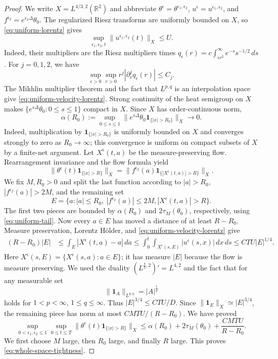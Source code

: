 \documentclass[11pt,reqno]{amsproc}
\newcommand{\R}{\mathbb R}
\newcommand{\one}{\mathbf 1}
\newcommand{\dd}{\,d}
\begin{document}
\begin{proof}
We write $X=L^{4/3,2}(\R^2)$ and abbreviate
$\theta^\epsilon=\theta^{\epsilon_1,\epsilon_2}$,
$u^\epsilon=u^{\epsilon_1,\epsilon_2}$, and
$f^{\epsilon_2}=e^{\epsilon_2\Delta}\theta_0$.  The regularized Riesz
transforms are uniformly bounded on $X$, so \eqref{eq:uniform-lorentz} gives
\begin{equation}\label{eq:uniform-velocity-lorentz}
 \sup_{\epsilon_1,\epsilon_2,t}
 \|u^{\epsilon_1,\epsilon_2}(t)\|_X\le U.
\end{equation}
Indeed, their multipliers are the Riesz multipliers times
$q_\epsilon(r)=c\int_{\epsilon r^2}^\infty e^{-s}s^{-1/2}\dd s$.  For
$j=0,1,2$, we have
\[
  \sup_{\epsilon>0}\sup_{r>0}
  r^j|\partial_r^jq_\epsilon(r)|\leq C_j.
\]
The Mikhlin multiplier theorem and the fact that $L^{p,q}$ is an interpolation space give \eqref{eq:uniform-velocity-lorentz}.
Strong continuity of the heat semigroup on $X$ makes
$\{e^{s\Delta}\theta_0:0\le s\le1\}$ compact in $X$.  Since $X$ has
order-continuous norm,
\begin{equation}\label{eq:initial-spatial-tail}
 \alpha(R_0):=\sup_{0\le s\le1}
 \|e^{s\Delta}\theta_0\one_{\{|x|>R_0\}}\|_X\longrightarrow0.
\end{equation}
Indeed, multiplication by $\one_{\{|x|>R_0\}}$ is uniformly bounded on $X$
and converges strongly to zero as $R_0\to\infty$; this convergence is uniform
on compact subsets of $X$ by a finite-net argument.
Let $X^\epsilon(t,a)$ be the measure-preserving flow.  Rearrangement
invariance and the flow formula yield
\[
 \|\theta^\epsilon(t)\one_{\{|x|>R\}}\|_X
 =\|f^{\epsilon_2}(a)
   \one_{\{|X^\epsilon(t,a)|>R\}}\|_X.
\]
We fix $M,R_0>0$ and split the last function according to
$|a|>R_0$, $|f^{\epsilon_2}(a)|>2M$, and the remaining set
\[
 E=\{a:|a|\le R_0,\ |f^{\epsilon_2}(a)|\le2M,
              |X^\epsilon(t,a)|>R\}.
\]
The first two pieces are bounded by $\alpha(R_0)$ and
$2\tau_M(\theta_0)$, respectively, using
\eqref{eq:uniform-tail}.  Now every $a\in E$ has moved a distance of at least
$R-R_0$.  Measure preservation, Lorentz H\"older, and
\eqref{eq:uniform-velocity-lorentz} give
\begin{align*}
 (R-R_0)|E|
 &\le\int_E|X^\epsilon(t,a)-a|\dd a
 \le\int_0^t\int_{X^\epsilon(s,E)}|u^\epsilon(s,x)|\dd x\dd s \le C T U |E|^{1/4}.
\end{align*}
Here $X^\epsilon(s,E)=\{X^\epsilon(s,a):a\in E\}$; it has measure $|E|$
because the flow is measure preserving. We used the duality $(L^{\frac{4}{3},2})' = L^{4,2}$
and the fact that for any measurable set
\[
\|\one_A\|_{L^{p,q}} = | A|^{\frac{1}{p}}
\]
holds for $1<p<\infty$, $1\le q\le\infty$. Thus $|E|^{3/4}\le CTU/D$.  Since
$\|\one_E\|_X\simeq|E|^{3/4}$, the remaining piece has norm at most
$CMTU/(R-R_0)$.  We have proved
\begin{equation}\label{eq:tightness-quantitative}
 \sup_{0<\epsilon_1,\epsilon_2\le1}\sup_{0\le t\le T}
 \|\theta^\epsilon(t)\one_{\{|x|>R\}}\|_X
 \le \alpha(R_0)+2\tau_M(\theta_0)+\frac{CMTU}{R-R_0}.
\end{equation}
We first choose $M$ large, then $R_0$ large, and finally $R$ large.  This proves
\eqref{eq:whole-space-tightness}.
\end{proof}
\end{document}
